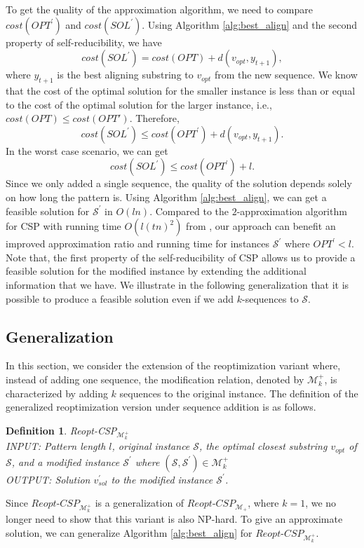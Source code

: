 \documentclass[journal]{acm_proc_article-sp}
\newtheorem{definition}{Definition}
\begin{document}
To get the quality of the approximation algorithm, we need to compare $cost(OPT^\prime)$ and $cost(SOL^\prime)$. Using Algorithm \ref{alg:best_align} and the second property of self-reducibility, we have
$$cost(SOL^\prime) = cost(OPT) + d(v_{opt}, y_{t+1}),$$ where $y_{t+1}$ is the best aligning substring to $v_{opt}$ from the new sequence. We know that the cost of the optimal solution for the smaller instance is less than or equal to the cost of the optimal solution for the larger instance, i.e., $cost(OPT) \leq cost(OPT')$. Therefore,
$$cost(SOL^\prime)  \leq cost(OPT^\prime)+ d(v_{opt}, y_{t+1}).$$
In the worst case scenario, we can get $$cost(SOL^\prime) \leq cost(OPT^\prime) + l .$$ 
Since we only added a single sequence, the quality of the solution depends solely on how long the pattern is.  Using Algorithm \ref{alg:best_align}, we can get  a feasible solution for $\mathcal{S^\prime}$ in $O(ln)$. Compared to the $2$-approximation algorithm for CSP with running time $O(l(tn)^2)$ from \cite{Lanctot1998}, our approach can benefit an improved approximation ratio and running time for instances $\mathcal{S}^\prime$ where $OPT^\prime < l$.
Note that, the first property of the self-reducibility of CSP allows us to provide a feasible solution for the modified instance by extending the additional information that we have. We illustrate in the following generalization that it is possible to produce a feasible solution even if we add $k$-sequences to $\mathcal{S}$. 
 




\subsection{Generalization}
In this section, we consider the extension of the reoptimization variant where, instead of adding one sequence, the modification relation, denoted by $\mathcal{M}_k^+ $, is characterized by adding $k$ sequences to the original instance. The definition of the generalized reoptimization version under sequence addition is as follows.
\begin{definition}{Reopt-CSP$_{\mathcal{M}_k^+}$} \ \\ INPUT: Pattern length $l$, original instance $\mathcal{S}$, the optimal closest substring $v_{opt}$ of $\mathcal{S}$, and a modified instance $\mathcal{S}^\prime$ where $(\mathcal{S}, \mathcal{S}^\prime) \in  \mathcal{M}_k^+$\\
\noindent OUTPUT: Solution $v^\prime_{sol}$ to the modified instance $\mathcal{S}^\prime$.
\end{definition}
Since $Reopt$-$CSP_{\mathcal{M}_k^+}$ is a generalization of $Reopt$-$CSP_{\mathcal{M}_+}$, where $k=1$, we no longer need to show that this variant is also NP-hard. To give an approximate solution, we  can generalize Algorithm \ref{alg:best_align} for $Reopt$-$CSP_{\mathcal{M}_k^+}$. 
\end{document}
